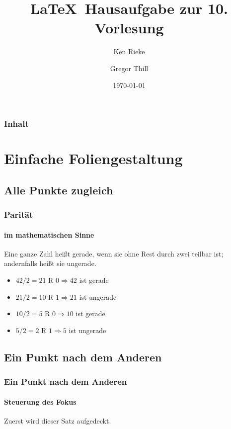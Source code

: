 \documentclass[ngerman]{beamer}
\title{\LaTeX\ Hausaufgabe zur 10. Vorlesung}
\author{Ken Rieke \and Gregor Thill}
\institute{Technische Universität Carolo-Wilhelmina zu Braunschweig}
\date{\today}
\begin{document}
\frame{\titlepage}

\begin{frame}[label=inhalt]
  \frametitle{Inhalt}
  \tableofcontents[pausesections]
\end{frame}

\section{Einfache Foliengestaltung}
\subsection{Alle Punkte zugleich}
\begin{frame}[label=paritaet]
  \frametitle{Parität}
  \framesubtitle{im mathematischen Sinne}
  \begin{definition}
    Eine ganze Zahl heißt \alert{gerade}, wenn sie ohne Rest durch zwei teilbar
    ist; andernfalls heißt sie \alert{ungerade}.\cite{wikiped-1}
  \end{definition}
  \begin{example}
    \begin{itemize}
      \item $42 / 2 = 21$ R $0 \Rightarrow 42$ ist gerade
      \item $21 / 2 = 10$ R $1 \Rightarrow 21$ ist ungerade
      \item $10 / 2 = 5$ R $0 \Rightarrow 10$ ist gerade
      \item $5 / 2 = 2$ R $1 \Rightarrow 5$ ist ungerade
    \end{itemize}
  \end{example}
\end{frame}

\subsection{Ein Punkt nach dem Anderen}
\begin{frame}[label=reihe]
  \frametitle{Ein Punkt nach dem Anderen}
  \framesubtitle{Steuerung des Fokus}
  \begin{theorem}
    Zuerst wird dieser Satz aufgedeckt.
  \end{theorem}
\end{frame}
\end{document}
